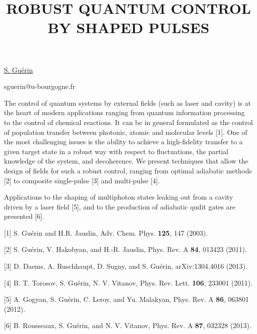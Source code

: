\title{ROBUST QUANTUM CONTROL BY SHAPED PULSES}

\underline{S. Gu\'erin} 

{\normalsize{\vspace{-4mm}
\dijon

\email sguerin@u-bourgogne.fr}}

The control of quantum systems by external fields (such as laser and cavity) is at the heart of modern applications ranging from quantum information processing to the control of chemical reactions.
It can be in general formulated as the control of population transfer between photonic, atomic and molecular levels [1].
One of the most challenging issues is the ability to achieve a high-fidelity transfer to a given target state in a robust way with respect to fluctuations, the partial knowledge of the system, and decoherence.  We present techniques that allow the design of fields for such a robust control, ranging from optimal adiabatic methods [2] to composite single-pulse [3] and multi-pulse [4].

Applications to the shaping of multiphoton states leaking out from a cavity driven by a laser field [5], and to the production of adiabatic qudit gates are presented [6].

{\normalsize
[1] S. Gu\'erin and H.R. Jauslin, Adv. Chem. Phys. \textbf{125}, 147 (2003).
\vsp

[2] S. Gu\'erin, V. Hakobyan, and H.-R. Jauslin, Phys. Rev. A  \textbf{84}, 013423 (2011).
\vsp

[3] D. Daems, A. Ruschhaupt, D. Sugny, and S. Gu\'erin, arXiv:1304.4016 (2013).
\vsp

[4] B. T. Torosov, S. Gu\'erin, N. V. Vitanov, Phys. Rev. Lett. \textbf{106}, 233001 (2011).
\vsp

[5] A. Gogyan, S. Gu\'erin, C. Leroy, and Yu. Malakyan, Phys. Rev. A \textbf{86}, 063801 (2012).
\vsp

[6] B. Rousseaux, S. Gu\'erin, and N. V. Vitanov, Phys. Rev. A \textbf{87}, 032328 (2013).
}

\vspace{\baselineskip}
